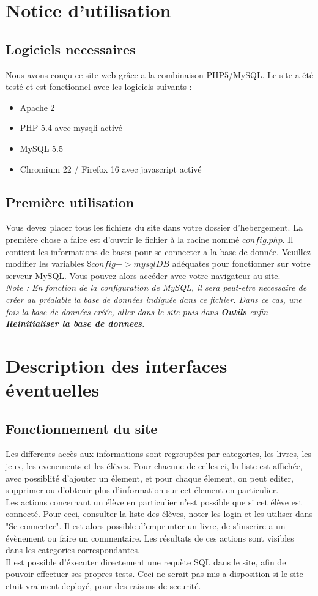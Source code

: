 \documentclass[a4paper, 11pt]{article}
\begin{document}
\section{Notice d'utilisation}
\subsection{Logiciels necessaires}
Nous avons conçu ce site web grâce a la combinaison PHP5/MySQL.
Le site a été testé et est fonctionnel avec les logiciels suivants :
\begin{itemize}
\item Apache 2
\item PHP 5.4 avec mysqli activé
\item MySQL 5.5
\item Chromium 22 / Firefox 16 avec javascript activé
\end{itemize}
\subsection{Première utilisation}
Vous devez placer tous les fichiers du site dans votre dossier d'hebergement. La première chose a faire est d'ouvrir le fichier à la racine nommé $config.php$. Il contient les informations de bases pour se connecter a la base de donnée. Veuillez modifier les variables $\$config->mysqlDB$ adéquates pour fonctionner sur votre serveur MySQL. 
Vous pouvez alors accéder avec votre navigateur au site.
\\ \textit{Note : 
En fonction de la configuration de MySQL, il sera peut-etre necessaire de créer au préalable la base de données indiquée dans ce fichier. Dans ce cas, une fois la base de données créée, aller dans le site puis dans \textbf{Outils} enfin \textbf{Reinitialiser la base de donnees}.}
\section{Description des interfaces éventuelles}
\subsection{Fonctionnement du site}
Les differents accès aux informations sont regroupées par categories, les livres, les jeux, les evenements et les élèves. Pour chacune de celles ci, la liste est affichée, avec possiblité d'ajouter un élement, et pour chaque élement, on peut editer, supprimer ou d'obtenir plus d'information sur cet élement en particulier.
\\Les actions concernant un élève en particulier n'est possible que si cet élève est connecté. Pour ceci, consulter la liste des élèves, noter les login et les utiliser dans "Se connecter". Il est alors possible d'emprunter un livre, de s'inscrire a un évènement ou faire un commentaire. Les résultats de ces actions sont visibles dans les categories correspondantes.
\\Il est possible d'éxecuter directement une requète SQL dans le site, afin de pouvoir effectuer ses propres tests. Ceci ne serait pas mis a disposition si le site etait vraiment deployé, pour des raisons de securité.
\end{document}
